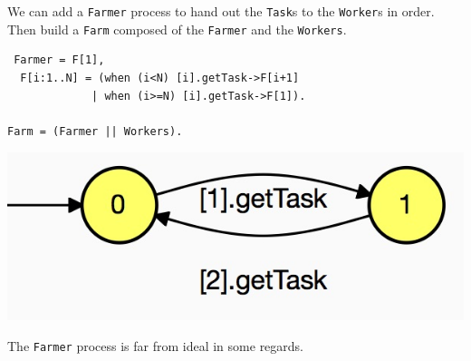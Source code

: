 \documentclass[]{article}
\begin{document}
 We can add a \verb$Farmer$ process to hand out the \verb$Task$s to the \verb$Worker$s in order. Then  build a \verb$Farm$ composed of the \verb$Farmer$ and the \verb$Workers$.

\begin{center}\begin{minipage}{0.55\textwidth}
\begin{verbatim}
 Farmer = F[1],
  F[i:1..N] = (when (i<N) [i].getTask->F[i+1]
             | when (i>=N) [i].getTask->F[1]).

Farm = (Farmer || Workers).
   \end{verbatim}
\end{minipage}\begin{minipage}{0.4\textwidth}
\begin{center}\includegraphics[scale=0.275]{Farmer.jpg}\end{center}
\end{minipage}
\end{center}

The \verb$Farmer$  process is far from ideal in some regards.
\end{document}
